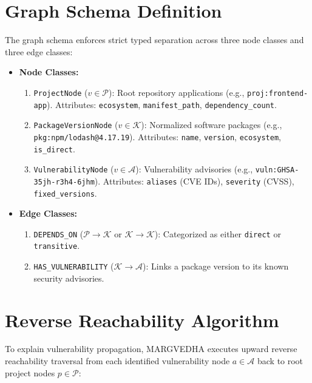 \documentclass[12pt,a4paper,oneside]{report}
\begin{document}
\section{Graph Schema Definition}
The graph schema enforces strict typed separation across three node classes and three edge classes:
\begin{itemize}
    \item \textbf{Node Classes:}
    \begin{enumerate}
        \item \texttt{ProjectNode} ($v \in \mathcal{P}$): Root repository applications (e.g., \texttt{proj:frontend-app}). Attributes: \texttt{ecosystem}, \texttt{manifest\_path}, \texttt{dependency\_count}.
        \item \texttt{PackageVersionNode} ($v \in \mathcal{K}$): Normalized software packages (e.g., \texttt{pkg:npm/lodash@4.17.19}). Attributes: \texttt{name}, \texttt{version}, \texttt{ecosystem}, \texttt{is\_direct}.
        \item \texttt{VulnerabilityNode} ($v \in \mathcal{A}$): Vulnerability advisories (e.g., \texttt{vuln:GHSA-35jh-r3h4-6jhm}). Attributes: \texttt{aliases} (CVE IDs), \texttt{severity} (CVSS), \texttt{fixed\_versions}.
    \end{enumerate}
    \item \textbf{Edge Classes:}
    \begin{enumerate}
        \item \texttt{DEPENDS\_ON} ($\mathcal{P} \to \mathcal{K}$ or $\mathcal{K} \to \mathcal{K}$): Categorized as either \texttt{direct} or \texttt{transitive}.
        \item \texttt{HAS\_VULNERABILITY} ($\mathcal{K} \to \mathcal{A}$): Links a package version to its known security advisories.
    \end{enumerate}
\end{itemize}

\section{Reverse Reachability Algorithm}
To explain vulnerability propagation, MARGVEDHA executes upward reverse reachability traversal from each identified vulnerability node $a \in \mathcal{A}$ back to root project nodes $p \in \mathcal{P}$:
\end{document}
